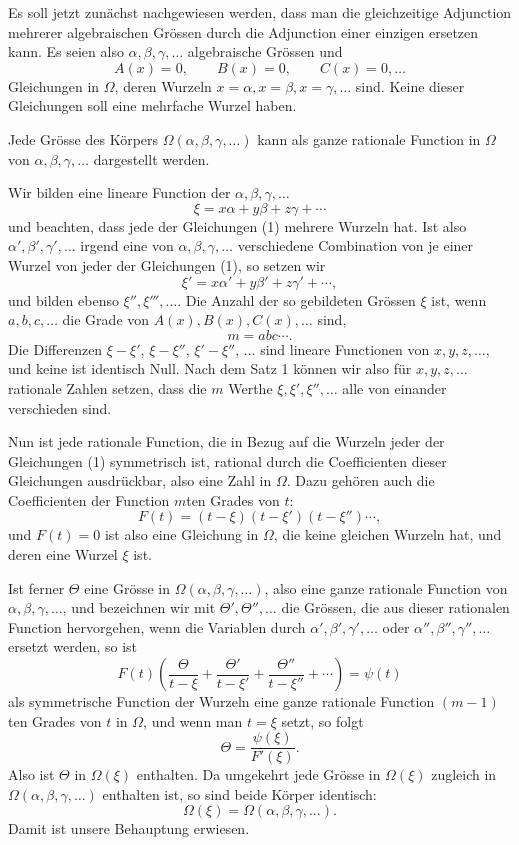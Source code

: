\documentclass[11pt]{article}
\begin{document}
Es soll jetzt zunächst nachgewiesen werden, dass man die gleichzeitige Adjunction mehrerer algebraischen Grössen durch die Adjunction einer einzigen ersetzen kann. Es seien also $\alpha,\beta,\gamma,\ldots$ algebraische Grössen und
\[
\tag{1}
        A(x)=0,\qquad B(x)=0,\qquad C(x)=0,\ldots
\]
Gleichungen in $\Omega$, deren Wurzeln $x=\alpha,x=\beta,x=\gamma,\ldots$ sind. Keine dieser Gleichungen soll eine mehrfache Wurzel haben.

Jede Grösse des Körpers $\Omega(\alpha,\beta,\gamma,\ldots)$ kann als ganze rationale Function in $\Omega$ von $\alpha,\beta,\gamma,\ldots$ dargestellt werden.

Wir bilden eine lineare Function der $\alpha,\beta,\gamma,\ldots$
\[
        \xi=x\alpha+y\beta+z\gamma+\cdots
\]
und beachten, dass jede der Gleichungen (1) mehrere Wurzeln hat. Ist also $\alpha',\beta',\gamma',\ldots$ irgend eine von $\alpha,\beta,\gamma,\ldots$ verschiedene Combination von je einer Wurzel von jeder der Gleichungen (1), so setzen wir
\[
        \xi'=x\alpha'+y\beta'+z\gamma'+\cdots,
\]
und bilden ebenso $\xi'',\xi''',\ldots$. Die Anzahl der so gebildeten Grössen $\xi$ ist, wenn $a,b,c,\ldots$ die Grade von $A(x),B(x),C(x),\ldots$ sind,
\[
        m=abc\cdots.
\]
Die Differenzen $\xi-\xi'$, $\xi-\xi''$, $\xi'-\xi''$, $\ldots$ sind lineare Functionen von $x,y,z,\ldots$, und keine ist identisch Null. Nach dem Satz 1 können wir also für $x,y,z,\ldots$ rationale Zahlen setzen, dass die $m$ Werthe $\xi,\xi',\xi'',\ldots$ alle von einander verschieden sind.

Nun ist jede rationale Function, die in Bezug auf die Wurzeln jeder der Gleichungen (1) symmetrisch ist, rational durch die Coefficienten dieser Gleichungen ausdrückbar, also eine Zahl in $\Omega$. Dazu gehören auch die Coefficienten der Function $m$ten Grades von $t$:
\[
\tag{2}
        F(t)=(t-\xi)(t-\xi')(t-\xi'')\cdots,
\]
und $F(t)=0$ ist also eine Gleichung in $\Omega$, die keine gleichen Wurzeln hat, und deren eine Wurzel $\xi$ ist.

Ist ferner $\Theta$ eine Grösse in $\Omega(\alpha,\beta,\gamma,\ldots)$, also eine ganze rationale Function von $\alpha,\beta,\gamma,\ldots$, und bezeichnen wir mit $\Theta',\Theta'',\ldots$ die Grössen, die aus dieser rationalen Function hervorgehen, wenn die Variablen durch $\alpha',\beta',\gamma',\ldots$ oder $\alpha'',\beta'',\gamma'',\ldots$ ersetzt werden, so ist
\[
        F(t)\left(
        \frac{\Theta}{t-\xi}+
        \frac{\Theta'}{t-\xi'}+
        \frac{\Theta''}{t-\xi''}+\cdots
        \right)=\psi(t)
\]
als symmetrische Function der Wurzeln eine ganze rationale Function $(m-1)$ten Grades von $t$ in $\Omega$, und wenn man $t=\xi$ setzt, so folgt
\[
\tag{3}
        \Theta=\frac{\psi(\xi)}{F'(\xi)}.
\]
Also ist $\Theta$ in $\Omega(\xi)$ enthalten. Da umgekehrt jede Grösse in $\Omega(\xi)$ zugleich in $\Omega(\alpha,\beta,\gamma,\ldots)$ enthalten ist, so sind beide Körper identisch:
\[
        \Omega(\xi)=\Omega(\alpha,\beta,\gamma,\ldots).
\]
Damit ist unsere Behauptung erwiesen.
\end{document}
